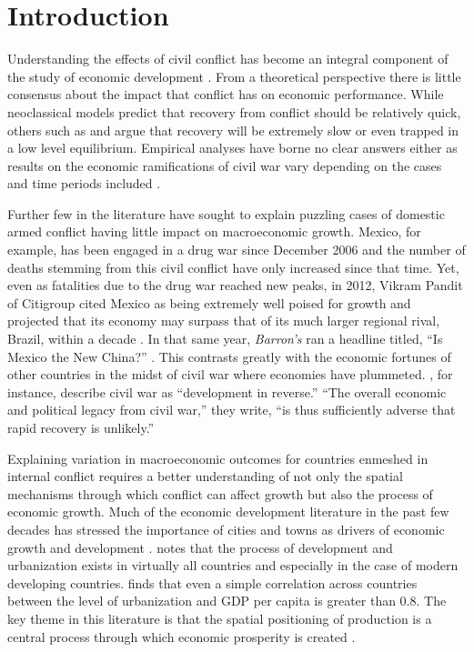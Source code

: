 
\section{Introduction}
\label{intro}

Understanding the effects of civil conflict has become an integral component of the study of economic development \citep{serneels:verpoorten:2013}. From a theoretical perspective there is little consensus about the impact that conflict has on economic performance. While neoclassical models predict that recovery from conflict should be relatively quick, others such as \citet{barro:martin:2004} and \citet{sachs:2006} argue that recovery will be extremely slow or even trapped in a low level equilibrium. Empirical analyses have borne no clear answers either as results on the economic ramifications of civil war vary depending on the cases and time periods included \citep{kang:meernik:2005}. 

Further few in the literature have sought to explain puzzling cases of domestic armed conflict having little impact on macroeconomic growth. Mexico, for example, has been engaged in a drug war since December 2006 and the number of deaths stemming from this civil conflict have only increased since that time. Yet, even as fatalities due to the drug war reached new peaks, in 2012, Vikram Pandit of Citigroup cited Mexico as being extremely well poised for growth and projected that its economy may surpass that of its much larger regional rival, Brazil, within a decade \citep{vardi:2012}. In that same year, \emph{Barron's} ran a headline titled, ``Is Mexico the New China?'' \citep{kapadia:2012}. This contrasts greatly with the economic fortunes of other countries in the midst of civil war where economies have plummeted. \citet{collier:elliott:etal:2003}, for instance, describe civil war as ``development in reverse.'' ``The overall economic and political legacy from civil war,'' they write, ``is thus sufficiently adverse that rapid recovery is unlikely.''  

Explaining variation in macroeconomic outcomes for countries enmeshed in internal conflict requires a better understanding of not only the spatial mechanisms through which conflict can affect growth but also the process of economic growth. Much of the economic development literature in the past few decades has stressed the importance of cities and towns as drivers of economic growth and development \citep{hanson:2005}. \citet{venables:2005} notes that the process of development and urbanization exists in virtually all countries and especially in the case of modern developing countries. \citet{henderson:2000} finds that even a simple correlation across countries between the level of urbanization and GDP per capita is greater than 0.8. The key theme in this literature is that the spatial positioning of production is a central process through which economic prosperity is created \citep{krugman:1991}.

